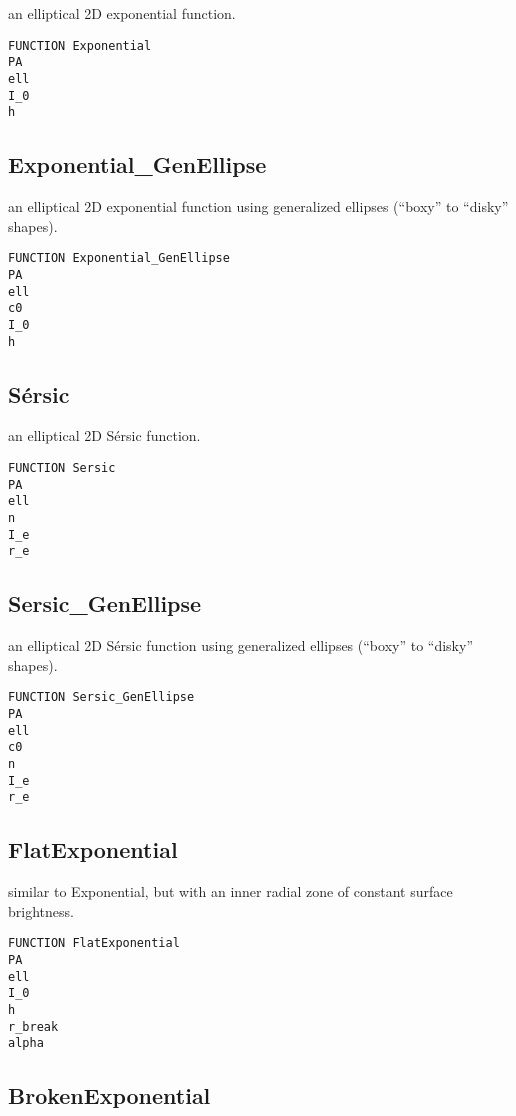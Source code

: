 \documentclass[10pt]{article}
\begin{document}
an elliptical 2D exponential function.

\begin{verbatim}
FUNCTION Exponential
PA
ell
I_0
h
\end{verbatim}


\subsection{Exponential\_GenEllipse}

an elliptical 2D exponential function using generalized ellipses (``boxy'' to ``disky'' shapes).

\begin{verbatim}
FUNCTION Exponential_GenEllipse
PA
ell
c0
I_0
h
\end{verbatim}


\subsection{S\'ersic}

an elliptical 2D S\'ersic function.

\begin{verbatim}
FUNCTION Sersic
PA
ell
n
I_e
r_e
\end{verbatim}


\subsection{Sersic\_GenEllipse}
an elliptical 2D S\'ersic function using
generalized ellipses (``boxy'' to ``disky'' shapes).

\begin{verbatim}
FUNCTION Sersic_GenEllipse
PA
ell
c0
n
I_e
r_e
\end{verbatim}


\subsection{FlatExponential} 

similar to Exponential, but with an inner radial zone
of constant surface brightness.

\begin{verbatim}
FUNCTION FlatExponential
PA
ell
I_0
h
r_break
alpha
\end{verbatim}


\subsection{BrokenExponential}
\end{document}
